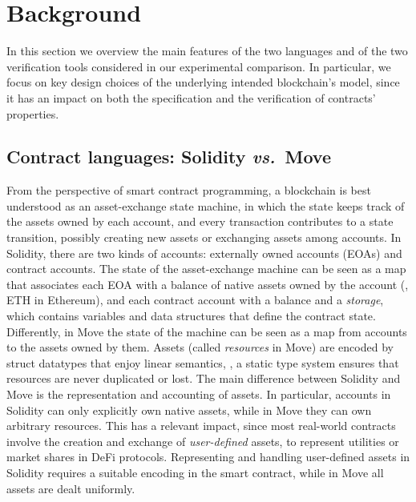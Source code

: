 \section{Background}
\label{sec:background}

In this section we overview the main features of 
the two languages and of the two verification tools
considered in our experimental comparison. 
In particular, we focus on key design choices of the underlying intended blockchain's model, since it has an impact on both the specification and the verification of contracts' properties. %

\subsection{Contract languages: Solidity \emph{vs.}~Move}
\label{sec:background:languages}

From the perspective of smart contract programming, a blockchain is best understood as an asset-exchange state machine, in which the state keeps track of the assets owned by each account, and every transaction contributes to a state transition, possibly creating new assets or exchanging assets among accounts. 
%
In Solidity, there are two kinds of accounts: 
externally owned accounts (EOAs) and contract accounts.
The state of the asset-exchange machine can be seen as a map that associates each EOA with a balance of native assets owned by the account (\eg, ETH in Ethereum), and each contract account with a balance and a \emph{storage}, which contains variables and data structures that define the contract state. 
Differently, in Move the state of the machine can be seen as a map from accounts to the assets owned by them. 
Assets (called \emph{resources} in Move) are encoded by struct datatypes that enjoy linear semantics, \ie, a static type system ensures that resources are never duplicated or lost.
%
The main difference between Solidity and Move is the representation and accounting of  assets. 
In particular, accounts in Solidity can only explicitly own native assets, while in Move they can own arbitrary resources.
This has a relevant impact, since most real-world contracts involve the creation and exchange of \emph{user-defined} assets, \eg to represent utilities or market shares in DeFi protocols.
Representing and handling user-defined assets in Solidity requires a suitable encoding in the smart contract, while in Move all assets are dealt uniformly.


